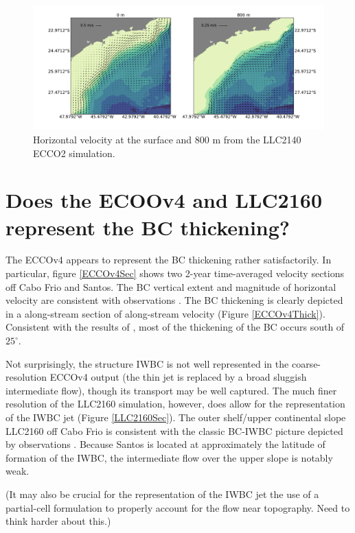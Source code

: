 \documentclass[11pt]{article}
\begin{document}
\begin{figure}[!ht]
  \label{LLC2160currents}
  \centering
      \includegraphics[width=1.05\textwidth]{figs/LLC2160_currents.pdf}
  \caption{Horizontal velocity at the surface and 800 m from the LLC2140
            ECCO2 simulation.}
\end{figure}

\section{Does the ECOOv4 and LLC2160 represent the BC thickening?}
The ECCOv4 appears to represent the BC thickening rather satisfactorily.
In particular, figure \ref{ECCOv4Sec} shows two 2-year time-averaged velocity
sections off Cabo Frio and Santos. The BC vertical extent and magnitude of
horizontal velocity are consistent with observations \citep[e.g., ][]{rocha_etal2014}.
The BC thickening is clearly depicted in a along-stream section of along-stream
velocity (Figure \ref{ECCOv4Thick}). Consistent with the results of
\cite{rocha_etal2014}, most
of the thickening of the BC occurs south of $25^\circ$.

Not surprisingly, the structure IWBC is not well represented in the coarse-resolution
ECCOv4 output (the thin jet is replaced by a broad sluggish intermediate flow),
though its transport may be well captured. The much finer resolution of the
LLC2160 simulation, however, does allow for the representation of the IWBC jet
(Figure \ref{LLC2160Sec}). The outer shelf/upper continental slope LLC2160 off
Cabo Frio is consistent with the classic BC-IWBC picture depicted by observations
\citep{silveira_etal2004}. Because Santos is located at approximately the latitude
of formation of the IWBC, the intermediate flow over the upper slope is notably weak.


(It may also be crucial for the representation of the IWBC jet the
use of a partial-cell formulation
to properly account for the flow near topography. Need to think harder about this.)
\end{document}
